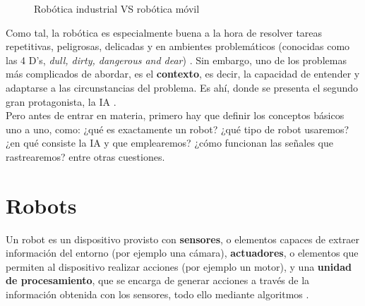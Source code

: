 \begin{figure} [h]
	\centering
	\quad
	\caption{Robótica industrial VS robótica móvil}
	\label{fig:industrial_vs_mobile}
\end{figure}

Como tal, la robótica es especialmente buena a la hora de resolver tareas repetitivas, peligrosas, delicadas y en ambientes problemáticos (conocidas como las 4 D's, \emph{dull, dirty, dangerous and dear}) \cite{4-d}. Sin embargo, uno de los problemas más complicados de abordar, es el \textbf{contexto}, es decir, la capacidad de entender y adaptarse a las circunstancias del problema. Es ahí, donde se presenta el segundo gran protagonista, la \ac{IA} \cite{dworakowski2020robots}.\\

Pero antes de entrar en materia, primero hay que definir los conceptos básicos uno a uno, como: ¿qué es exactamente un robot? ¿qué tipo de robot usaremos? ¿en qué consiste la \ac{IA} y que emplearemos? ¿cómo funcionan las señales que rastrearemos? entre otras cuestiones.

\section{Robots}
\label{sec:robots}

Un robot es un dispositivo provisto con \textbf{sensores}, o elementos capaces de extraer información del entorno (por ejemplo una cámara), \textbf{actuadores}, o elementos que permiten al dispositivo realizar acciones (por ejemplo un motor), y una \textbf{unidad de procesamiento}, que se encarga de generar acciones a través de la información obtenida con los sensores, todo ello mediante algoritmos \cite{Wang2022}.\\

